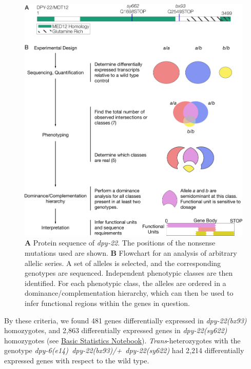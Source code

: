 \documentclass[8pt, twocolumn]{article}
\newcommand{\gene}[1]{\mbox{\emph{#1}}}
\newcommand{\dpy}[1]{\gene{dpy-22#1}}
\newcommand{\strongn}{2,863}
\newcommand{\weakn}{481}
\newcommand{\transn}{2,214}
\newcommand{\bx}{\dpy{(bx93)}}
\newcommand{\sy}{\dpy{(sy622)}}
\begin{document}
\begin{figure}
  \centering{}
  \includegraphics[width=\textwidth]{../../figs/Flowchart_Conceptual.pdf}
  \caption{
  \textbf{A} Protein sequence of \dpy{}. The positions of the nonsense
  mutations used are shown.
  \textbf{B} Flowchart for an analysis of arbitrary allelic series. A set of
  alleles is selected, and the corresponding genotypes are sequenced.
  Independent phenotypic classes are then identified. For each phenotypic class,
  the alleles are ordered in a dominance/complementation hierarchy, which can
  then be used to infer functional regions within the genes in question.}
\label{fig:flowchart}
\end{figure}

By these criteria, we found \weakn{} genes differentially expressed in
\bx{} homozygotes, and \strongn{} differentially expressed genes in
\sy{} homozygotes (see
\href{https://wormlabcaltech.github.io/med-cafe/notebook/basic.html}{Basic
Statistics Notebook}). \emph{Trans}-heterozygotes with the
genotype \gene{dpy-6(e14) dpy-22(bx93)/+ dpy-22(sy622)} had \transn{}
differentially expressed genes with respect to the wild type.
\end{document}
